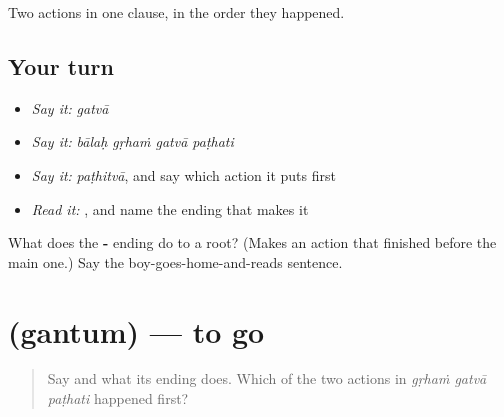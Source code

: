 \begin{grammarlens}[title={What you've built}]
Two actions in one clause, in the order they happened.
\end{grammarlens}

\subsection*{Your turn}
\begin{itemize}
\raggedright
  \item \emph{Say it:} \emph{gatvā}
  \item \emph{Say it:} \emph{bālaḥ gṛhaṁ gatvā paṭhati}
  \item \emph{Say it:} \emph{paṭhitvā}, and say which action it puts first
  \item \emph{Read it:} \textbf{}, and name the ending that makes it
\end{itemize}

\begin{tcolorbox}[breakable,colback=teal!4,colframe=teal!35!black,title={Before you move on}]
What does the \textbf{-} ending do to a root? (Makes an action that finished before the main one.) Say the boy-goes-home-and-reads sentence.
\end{tcolorbox}
\section[\texorpdfstring{\sk{गन्तुम्} (gantum)}{गन्तुम् (gantum)}]{ (gantum) — to go}

\label{lesson:SA-C55-gantum}



\begin{quote}
Say \textbf{} and what its ending does. Which of the two actions in \emph{gṛhaṁ gatvā paṭhati} happened first?
\end{quote}

